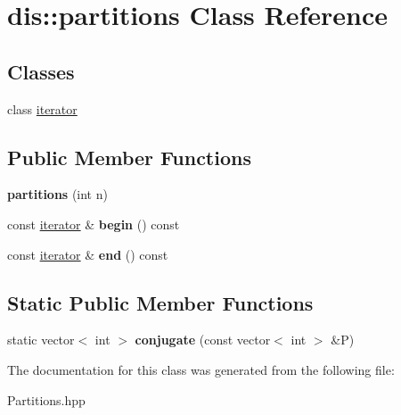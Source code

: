 \hypertarget{classdis_1_1partitions}{\section{dis\-:\-:partitions Class Reference}
\label{classdis_1_1partitions}
}
\subsection*{Classes}
\begin{DoxyCompactItemize}
\item 
class \hyperlink{classdis_1_1partitions_1_1iterator}{iterator}
\end{DoxyCompactItemize}
\subsection*{Public Member Functions}
\begin{DoxyCompactItemize}
\item 
\hypertarget{classdis_1_1partitions_a4828735b70d897ff8b3aafa4b44dc3db}{{\bfseries partitions} (int n)}\label{classdis_1_1partitions_a4828735b70d897ff8b3aafa4b44dc3db}

\item 
\hypertarget{classdis_1_1partitions_ad982f1be87451a35a341239a0bc8784f}{const \hyperlink{classdis_1_1partitions_1_1iterator}{iterator} \& {\bfseries begin} () const }\label{classdis_1_1partitions_ad982f1be87451a35a341239a0bc8784f}

\item 
\hypertarget{classdis_1_1partitions_a712223ab287d1b1610654d2b48d559ca}{const \hyperlink{classdis_1_1partitions_1_1iterator}{iterator} \& {\bfseries end} () const }\label{classdis_1_1partitions_a712223ab287d1b1610654d2b48d559ca}

\end{DoxyCompactItemize}
\subsection*{Static Public Member Functions}
\begin{DoxyCompactItemize}
\item 
\hypertarget{classdis_1_1partitions_a0a92ed5b82ca323718109dc649536579}{static vector$<$ int $>$ {\bfseries conjugate} (const vector$<$ int $>$ \&P)}\label{classdis_1_1partitions_a0a92ed5b82ca323718109dc649536579}

\end{DoxyCompactItemize}


The documentation for this class was generated from the following file\-:\begin{DoxyCompactItemize}
\item 
Partitions.\-hpp\end{DoxyCompactItemize}
